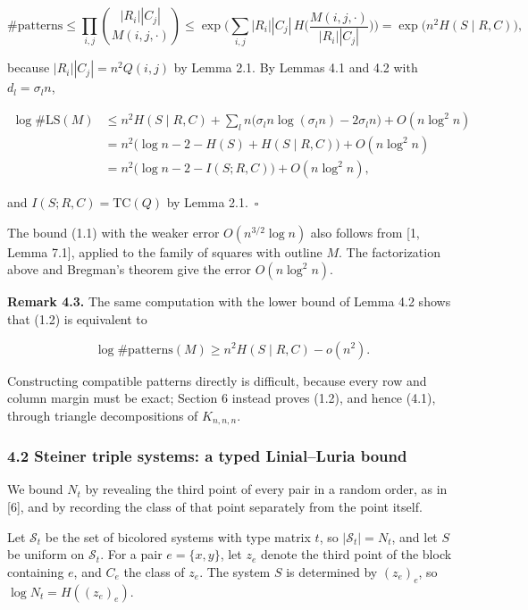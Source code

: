 \documentclass[english,11pt,a4paper]{article}
\begin{document}
\nopagebreak[4]
\[\#\text{patterns}\le\prod_{i,j}\binom{|R_i||C_j|}{M(i,j,\cdot)}\le\exp\Big(\sum_{i,j}|R_i||C_j|\,H\Big(\frac{M(i,j,\cdot)}{|R_i||C_j|}\Big)\Big)=\exp\big(n^2H(S\mid R,C)\big),\]

because \(|R_i||C_j|=n^2Q(i,j)\) by Lemma 2.1. By Lemmas 4.1 and 4.2 with \(d_l=\sigma_l n\),

\nopagebreak[4]
\[\begin{aligned}
\log\#\mathrm{LS}(M)&\le n^2H(S\mid R,C)+\sum_l n\big(\sigma_l n\log(\sigma_l n)-2\sigma_l n\big)+O(n\log^2 n)\\
&=n^2\big(\log n-2-H(S)+H(S\mid R,C)\big)+O(n\log^2 n)\\
&=n^2\big(\log n-2-I(S;R,C)\big)+O(n\log^2 n),
\end{aligned}\]

and \(I(S;R,C)=\mathrm{TC}(Q)\) by Lemma 2.1.~\(\square\)

The bound (1.1) with the weaker error \(O(n^{3/2}\log n)\) also follows from {[}1, Lemma 7.1{]}, applied to the family of squares with outline \(M\). The factorization above and Bregman's theorem give the error \(O(n\log^2 n)\).

\textbf{Remark 4.3.} The same computation with the lower bound of Lemma 4.2 shows that (1.2) is equivalent to

\nopagebreak[4]
\[\log\#\text{patterns}(M)\ge n^2H(S\mid R,C)-o(n^2).\tag{4.1}\]

Constructing compatible patterns directly is difficult, because every row and column margin must be exact; Section 6 instead proves (1.2), and hence (4.1), through triangle decompositions of \(K_{n,n,n}\).

\subsubsection{4.2 Steiner triple systems: a typed Linial--Luria bound}\label{steiner-triple-systems-a-typed-linialluria-bound}

We bound \(N_t\) by revealing the third point of every pair in a random order, as in {[}6{]}, and by recording the class of that point separately from the point itself.

Let \(\mathcal S_t\) be the set of bicolored systems with type matrix \(t\), so \(|\mathcal S_t|=N_t\), and let \(S\) be uniform on \(\mathcal S_t\). For a pair \(e=\{x,y\}\), let \(z_e\) denote the third point of the block containing \(e\), and \(C_e\) the class of \(z_e\). The system \(S\) is determined by \((z_e)_e\), so \(\log N_t=H((z_e)_e)\).
\end{document}
